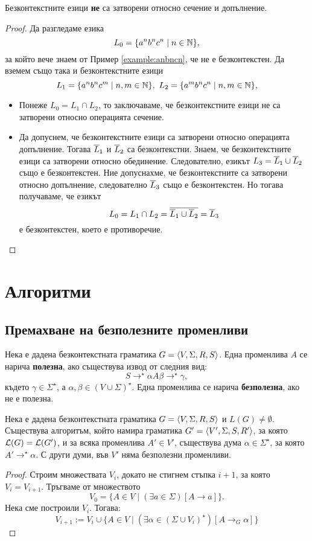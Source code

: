 \begin{thm}
  Безконтекстните езици {\bf не} са затворени относно сечение и допълнение.
\end{thm}
\begin{proof}
  Да разгледаме езика
  \[L_0 = \{a^nb^nc^n\mid n\in\mathbb{N}\},\] за който вече знаем от Пример \ref{example:anbncn}, че не е безконтекстен.
  Да вземем също така и безконтекстните езици 
  \[L_1 = \{a^nb^nc^m\mid n,m\in\mathbb{N}\},\ L_2 = \{a^mb^nc^n\mid n,m\in\mathbb{N}\},\]
  \begin{itemize}
  \item 
    Понеже $L_0 = L_1\cap L_2$, то заключаваме, че безконтекстните езици не са затворени 
    относно операцията сечение.
  \item
    Да допуснем, че безконтекстните езици са затворени относно операцията допълнение.
    Тогава  $\overline{L}_1$ и $\overline{L}_2$ са безконтекстни.
    Знаем, че безконтекстните езици са затворени относно обединение. 
    Следователно, езикът $L_3 = \overline{L}_1 \cup \overline{L}_2$ също е безконтекстен.
    Ние допуснахме, че безконтекстните са затворени относно допълнение, следователно $\overline{L}_3$
    също е безконтекстен.
    Но тогава получаваме, че езикът
    \[L_0 = L_1 \cap L_2 = \overline{\overline{L}_1 \cup \overline{L}_2} = \overline{L}_3\]
    е безконтекстен, което е противоречие.
  \end{itemize}
\end{proof}


\section{Алгоритми}

\subsection{Премахване на безполезните променливи}

Нека е дадена безконтекстната граматика $G = \langle{V,\Sigma,R,S}\rangle$.
Една променлива $A$ се нарича {\bf полезна}, ако съществува извод от следния вид:
\[S \to^\star \alpha A \beta \to^\star \gamma,\]
където $\gamma \in \Sigma^\star$, а $\alpha,\beta \in (V \cup \Sigma)^\star$.
Една променлива се нарича {\bf безполезна}, ако не е полезна.

\begin{lemma}
  Нека е дадена безконтекстната граматика $G = \langle{V,\Sigma,R,S}\rangle$ и $L(G) \neq \emptyset$.
  Съществува алгоритъм, който намира граматика $G' = \langle{V',\Sigma,S,R'}\rangle$, за която 
  $\mathcal{L}(G) = \mathcal{L}(G')$, и за всяка променлива $A' \in V'$, съществува дума $\alpha \in \Sigma^\star$,
  за която $A' \to^\star \alpha$. С други думи, във $V'$ няма безполезни променливи.
\end{lemma}
\begin{proof}
  Строим множествата $V_i$, докато не стигнем стъпка $i+1$, за която $V_i = V_{i+1}$.
  Тръгваме от множеството
  \[V_0 = \{A \in V \mid (\exists a\in \Sigma)[A \to a]\}.\]
  Нека сме построили $V_i$. Тогава:
  \[V_{i+1} := V_i \cup \{A \in V \mid (\exists \alpha \in (\Sigma \cup V_i)^\star)[A \to_G \alpha]\}\]
\end{proof}


